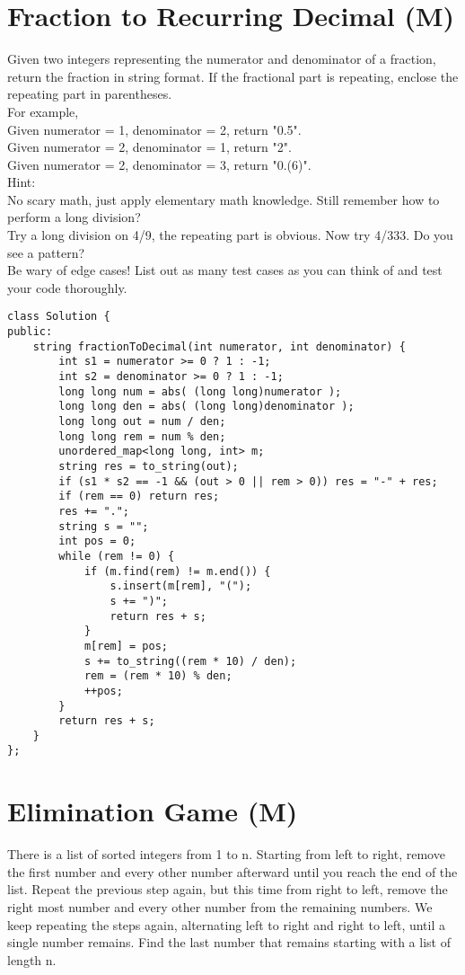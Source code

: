 \section{Fraction to Recurring Decimal (M)}
Given two integers representing the numerator and denominator of a fraction, return the fraction in string format. If the fractional part is repeating, enclose the repeating part in parentheses.\\

For example,\\
    Given numerator = 1, denominator = 2, return "0.5".\\
    Given numerator = 2, denominator = 1, return "2".\\
    Given numerator = 2, denominator = 3, return "0.(6)".\\

Hint:\\
    No scary math, just apply elementary math knowledge. Still remember how to perform a long division?\\
    Try a long division on 4/9, the repeating part is obvious. Now try 4/333. Do you see a pattern?\\
    Be wary of edge cases! List out as many test cases as you can think of and test your code thoroughly.\\

\begin{lstlisting}
class Solution {
public:
    string fractionToDecimal(int numerator, int denominator) {
        int s1 = numerator >= 0 ? 1 : -1;
        int s2 = denominator >= 0 ? 1 : -1;
        long long num = abs( (long long)numerator );
        long long den = abs( (long long)denominator );
        long long out = num / den;
        long long rem = num % den;
        unordered_map<long long, int> m;
        string res = to_string(out);
        if (s1 * s2 == -1 && (out > 0 || rem > 0)) res = "-" + res;
        if (rem == 0) return res;
        res += ".";
        string s = "";
        int pos = 0;
        while (rem != 0) {
            if (m.find(rem) != m.end()) {
                s.insert(m[rem], "(");
                s += ")";
                return res + s;
            }
            m[rem] = pos;
            s += to_string((rem * 10) / den);
            rem = (rem * 10) % den;
            ++pos;
        }
        return res + s;
    }
};
\end{lstlisting}


\section{Elimination Game (M)}
There is a list of sorted integers from 1 to n. Starting from left to right, remove the first number and every other number afterward until you reach the end of the list. Repeat the previous step again, but this time from right to left, remove the right most number and every other number from the remaining numbers. We keep repeating the steps again, alternating left to right and right to left, until a single number remains. Find the last number that remains starting with a list of length n.


